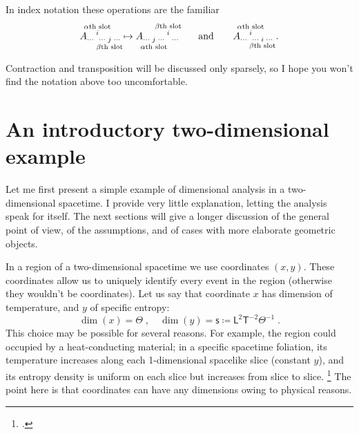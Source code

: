 \documentclass[a4paper,12pt,onecolumn,oneside,article,british]{memoir}
\newcommand*{\citep}{\footcites}
\newcommand*{\defd}{\coloneqq}
\newcommand*{\eg}{{e.g.}}
\newcommand*{\Le}{\textsf{L}}
\newcommand*{\Ti}{\textsf{T}}
\newcommand*{\Te}{\Theta}
\newcommand*{\Ent}{\textsf{s}}
\renewcommand*{\i}{\indices}
\begin{document}
In index notation these operations are the familiar
\begin{equation*}
  A\i{_{\dotsm\;}^{%
      \overset{\mathclap{\scriptstyle\text{$\alpha$th slot}}}{i}
    }_{\dotsm\;%
      \underset{\mathclap{\scriptstyle\text{$\beta$th slot}}}{j}
      \;\dotsm}}
  \mapsto
  A\i{_{\dotsm\;%
      \underset{\mathclap{\scriptstyle\text{$\alpha$th slot}}}{j}
      \;\dotsm\;}^{%
      \overset{\mathclap{\scriptstyle\text{$\beta$th slot}}}{i}
    }_{\;\dotsm}} 
  \qquad\text{and}\qquad
  A\i{_{\dotsm\;}^{%
      \overset{\mathclap{\scriptstyle\text{$\alpha$th slot}}}{i}
    }_{\dotsm\;%
      \underset{\mathclap{\scriptstyle\text{$\beta$th slot}}}{i}
      \;\dotsm}} \;.
\end{equation*}

Contraction and transposition will be discussed only sparsely, so I hope
you won't find the notation above too uncomfortable.



\section{An introductory two-dimensional example}
\label{sec:2d_example}

Let me first present a simple example of dimensional analysis in a
two-dimensional spacetime. I provide very little explanation, letting the
analysis speak for itself. The next sections will give a longer discussion
of the general point of view, of the assumptions, and of cases with more
elaborate geometric objects.

In a region of a two-dimensional spacetime we use coordinates $(x,y)$.
These coordinates allow us to uniquely identify every event in the region
(otherwise they wouldn't be coordinates). Let us say that coordinate $x$
has dimension of temperature, and $y$ of specific entropy:
\begin{equation}
  \label{eq:example_coords2d}
  \dim(x)=\Te \;,\quad
  \dim(y)= \Ent \defd \Le^{2}\Ti^{-2}\Te^{-1} \;.
\end{equation}
This choice may be possible for several reasons. For example, the region
could occupied by a heat-conducting material; in a specific spacetime
foliation, its temperature increases along each 1-dimensional spacelike
slice (constant $y$), and its entropy density is uniform on each slice but
increases from slice to slice. \citep[For general-relativistic
thermomechanics see
\eg][]{eckart1940c,maugin1974b,maugin1978b,maugin1978c,maugin1978d,maugin1978e,muschiketal2014}
The point here is that coordinates can have any dimensions owing to
physical reasons.
\end{document}
